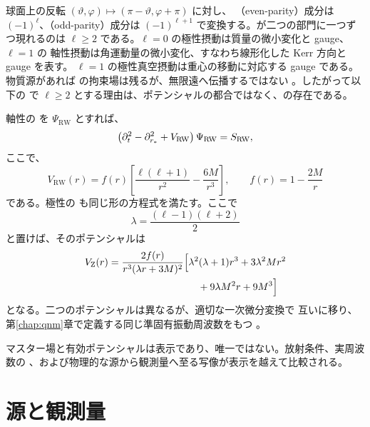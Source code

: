 球面上の反転 $(\vartheta,\varphi)\mapsto(\pi-\vartheta,\varphi+\pi)$ に対し、
（even-parity）成分は $(-1)^\ell$、（odd-parity）成分は
$(-1)^{\ell+1}$ で変換する。が二つの部門に一つずつ現れるのは
$\ell\geq2$ である。$\ell=0$ の極性摂動は質量の微小変化と gauge、$\ell=1$ の
軸性摂動は角運動量の微小変化、すなわち線形化した Kerr 方向と gauge を表す。
$\ell=1$ の極性真空摂動は重心の移動に対応する gauge である。物質源があれば
の拘束場は残るが、無限遠へ伝播するではない
\cite{Martel:2005ir}。したがって以下の で
$\ell\geq2$ とする理由は、ポテンシャルの都合ではなく、の存在である。

軸性の を $\Psi_{\mathrm{RW}}$ とすれば、
\begin{equation}
\left(
\partial_t^2-\partial_{r_*}^2+V_{\mathrm{RW}}
\right)\Psi_{\mathrm{RW}}
=
S_{\mathrm{RW}},
\label{eq:rw-master}
\end{equation}
ここで、
\begin{equation}
V_{\mathrm{RW}}(r)
=
f(r)
\left[
\frac{\ell(\ell+1)}{r^2}
-\frac{6M}{r^3}
\right],
\qquad
f(r)=1-\frac{2M}{r}
\label{eq:rw-potential}
\end{equation}
である。極性の も同じ形の方程式を満たす。ここで
\begin{equation}
\lambda
=
\frac{(\ell-1)(\ell+2)}{2}
\end{equation}
と置けば、そのポテンシャルは
\begin{align}
V_{\mathrm Z}(r)
&=
\frac{2f(r)}{r^3(\lambda r+3M)^2}
\Bigl[
\lambda^2(\lambda+1)r^3
+3\lambda^2Mr^2
\nonumber\\
&\hspace{9em}
+9\lambda M^2r
+9M^3
\Bigr]
\label{eq:zerilli-potential-minimum}
\end{align}
となる\cite{Chandrasekhar:book}。二つのポテンシャルは異なるが、適切な一次微分変換で
互いに移り、第\ref{chap:qnm}章で定義する同じ準固有振動周波数をもつ
\cite{Chandrasekhar:1975nkd}。

\begin{principlebox}
マスター場と有効ポテンシャルは表示であり、唯一ではない。放射条件、実周波数の
、および物理的な源から観測量へ至る写像が表示を越えて比較される。
\end{principlebox}

\section{源と観測量}


